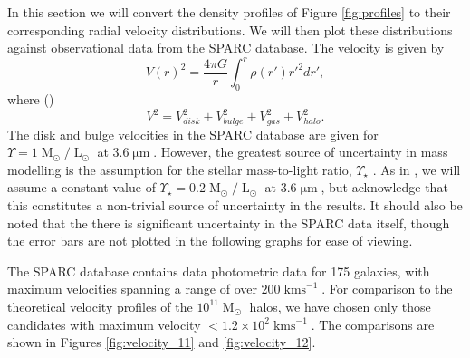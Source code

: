 \documentclass[a4paper,11pt]{article}
\begin{document}
In this section we will convert the density profiles of Figure \ref{fig:profiles} to their corresponding radial velocity distributions. We will then plot these distributions against observational data from the SPARC database. The velocity is given by
\begin{equation}
    V(r)^2 = \frac{4\pi G}{r}\int_0^r \rho(r')r'^2 dr',
\end{equation}
where (\cite{Sofue:2008wt})
\begin{equation}
    V^2 = V_{disk}^2 + V_{bulge}^2 + V_{gas}^2 + V_{halo}^2.
\end{equation}
The disk and bulge velocities in the SPARC database are given for $\Upsilon = 1 \operatorname{M}_{\odot}/\operatorname{L}_{\odot}$ at $3.6\operatorname{\mu m}$. However, the greatest source of uncertainty in mass modelling is the assumption for the stellar mass-to-light ratio, $\Upsilon_\star$ \cite{Lelli:2016zqa}. As in \cite{Robles:2018fur}, we will assume a constant value of $\Upsilon_\star = 0.2 \operatorname{M}_{\odot}/\operatorname{L}_{\odot}$ at $3.6\operatorname{\mu m}$, but acknowledge that this constitutes a non-trivial source of uncertainty in the results. It should also be noted that the there is significant uncertainty in the SPARC data itself, though the error bars are not plotted in the following graphs for ease of viewing. 

The SPARC database contains data photometric data for 175 galaxies, with maximum velocities spanning a range of over $200 \operatorname{kms}^{-1}$. For comparison to the theoretical velocity profiles of the $10^{11}\operatorname{M}_{\odot}$ halos, we have chosen only those candidates with maximum velocity $< 1.2\times 10^2 \operatorname{kms}^{-1}$. The comparisons are shown in Figures \ref{fig:velocity_11} and \ref{fig:velocity_12}.
\end{document}
